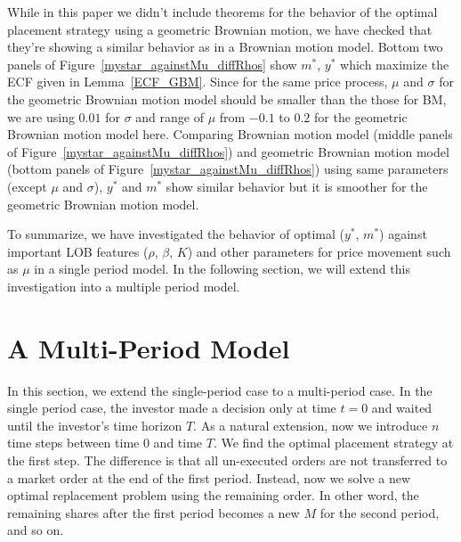\documentclass[11pt]{article}
\theoremstyle{plain}
\numberwithin{equation}{section}
\newcommand{\Red}{\color{Red}}
\begin{document}
{
While in this paper we didn't include theorems for the behavior of the optimal placement strategy using a geometric Brownian motion, we have checked that they're showing a similar behavior as in a Brownian motion model.  
Bottom two panels of Figure~\ref{mystar_againstMu_diffRhos} show $m^*$, $y^*$ which maximize the ECF given in Lemma~\ref{ECF_GBM}. Since for the same price process, $\mu$ and $\sigma$ for the geometric Brownian motion model should be smaller than the those for BM, we are using $0.01$ for $\sigma$ and range of $\mu$ from $-0.1$ to $0.2$ for  the geometric Brownian motion model here. 
Comparing Brownian motion model (middle panels  of Figure~\ref{mystar_againstMu_diffRhos}) and geometric Brownian motion model (bottom panels of Figure~\ref{mystar_againstMu_diffRhos}) using same parameters (except $\mu$ and $\sigma$), $y^*$ and $m^*$ show similar behavior but it is smoother for the geometric Brownian motion model. 
}

{\Red
To summarize, we have investigated the  behavior of optimal ($y^*$, $m^*$) against important LOB features ($\rho$, $\beta$, $K$) and other parameters for price movement such as $\mu$ in a single period model.  In the following section, we will extend this investigation into a multiple period model. 
}


%

%	
%	
%	




\newpage
\section{A Multi-Period Model}
 
 




\par In this section, we extend the single-period case to a multi-period case. In the single period case, the investor made a decision only at time $t=0$ and waited until the investor's time horizon $T$. As a natural extension, now we introduce $n$ time steps between time $0$ and time $T$. We find the optimal placement strategy at the first step. The difference is that all un-executed orders are not transferred to a market order at the end of the first period. Instead, now we solve a new optimal replacement problem using the remaining order. In other word, the remaining shares after the first period becomes a new $M$ for the second period, and so on.
\end{document}

